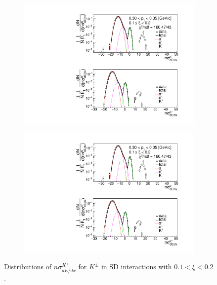 \begin{figure}[h!]
\begin{subfigure}{.3\textwidth}
		\includegraphics[width=\linewidth, page=6]{chapters/chrgSTAR/img/dEdx/fit2019_thirdStep_1_2.pdf}
	\end{subfigure}
	\begin{subfigure}{.33\textwidth}
		\includegraphics[width=\linewidth, page=7]{chapters/chrgSTAR/img/dEdx/fit2019_thirdStep_1_2.pdf}
	\end{subfigure}
	\caption[Distributions of $n\sigma^{K^\pm}_{dE/dx}$ for $K^\pm$ in SD interactions with $0.1 < \xi<0.2$]{Distributions of $n\sigma^{K^\pm}_{dE/dx}$ for $K^\pm$ in SD interactions with $0.1 < \xi<0.2$.}
	\label{fig:nsigmaKfit_2}
\end{figure}

